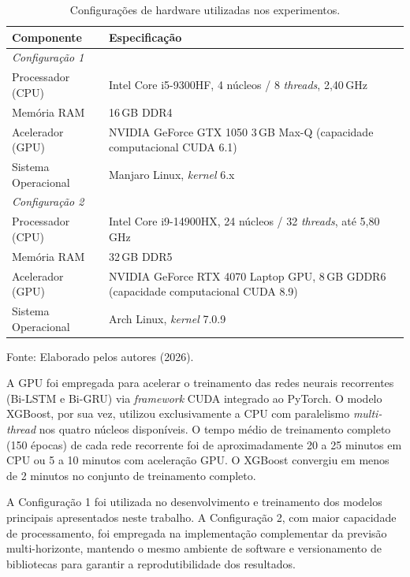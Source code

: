 \begin{table}[H]
\centering
\begin{tabularx}{\textwidth}{l X}
\toprule
\textbf{Componente} & \textbf{Especificação} \\
\midrule
\multicolumn{2}{l}{\textit{Configuração 1}} \\
\midrule
Processador (CPU) & Intel Core i5-9300HF, 4 núcleos / 8 \textit{threads}, 2{,}40\,GHz \\
Memória RAM       & 16\,GB DDR4 \\
Acelerador (GPU)  & NVIDIA GeForce GTX 1050 3\,GB Max-Q (capacidade computacional CUDA 6.1) \\
Sistema Operacional & Manjaro Linux, \textit{kernel} 6.x \\
\midrule
\multicolumn{2}{l}{\textit{Configuração 2}} \\
\midrule
Processador (CPU) & Intel Core i9-14900HX, 24 núcleos / 32 \textit{threads}, até 5{,}80\,GHz \\
Memória RAM       & 32\,GB DDR5 \\
Acelerador (GPU)  & NVIDIA GeForce RTX 4070 Laptop GPU, 8\,GB GDDR6 (capacidade computacional CUDA 8.9) \\
Sistema Operacional & Arch Linux, \textit{kernel} 7.0.9 \\
\bottomrule
\end{tabularx}
\caption{Configurações de hardware utilizadas nos experimentos.}
\small{Fonte: Elaborado pelos autores (2026).}
\label{tab:hardware}
\end{table}

A GPU foi empregada para acelerar o treinamento das redes neurais recorrentes (Bi-LSTM e Bi-GRU) via \textit{framework} CUDA integrado ao PyTorch. O modelo XGBoost, por sua vez, utilizou exclusivamente a CPU com paralelismo \textit{multi-thread} nos quatro núcleos disponíveis. O tempo médio de treinamento completo (150 épocas) de cada rede recorrente foi de aproximadamente 20 a 25 minutos em CPU ou 5 a 10 minutos com aceleração GPU. O XGBoost convergiu em menos de 2 minutos no conjunto de treinamento completo.

A Configuração 1 foi utilizada no desenvolvimento e treinamento dos modelos principais apresentados neste trabalho. A Configuração 2, com maior capacidade de processamento, foi empregada na implementação complementar da previsão multi-horizonte, mantendo o mesmo ambiente de software e versionamento de bibliotecas para garantir a reprodutibilidade dos resultados.

